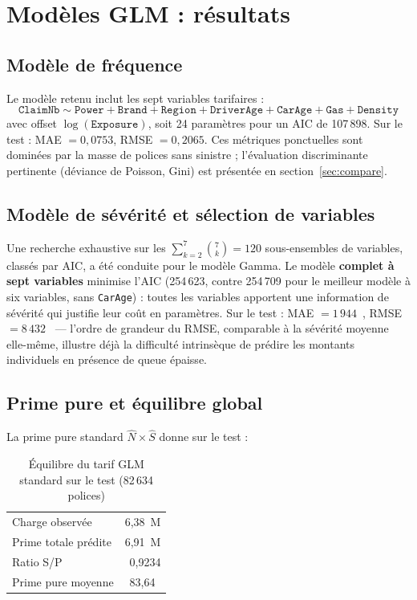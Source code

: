 \documentclass[11pt,a4paper]{article}
\newcommand{\eur}{\texteuro}
\begin{document}
\section{Modèles GLM : résultats}

\subsection{Modèle de fréquence}

Le modèle retenu inclut les sept variables tarifaires :
\[
\texttt{ClaimNb} \sim \texttt{Power} + \texttt{Brand} + \texttt{Region} + \texttt{DriverAge} + \texttt{CarAge} + \texttt{Gas} + \texttt{Density}
\]
avec offset $\log(\texttt{Exposure})$, soit 24 paramètres pour un AIC de 107\,898. Sur le test : MAE $= 0{,}0753$, RMSE $= 0{,}2065$. Ces métriques ponctuelles sont dominées par la masse de polices sans sinistre ; l'évaluation discriminante pertinente (déviance de Poisson, Gini) est présentée en section~\ref{sec:compare}.

\subsection{Modèle de sévérité et sélection de variables}

Une recherche exhaustive sur les $\sum_{k=2}^{7}\binom{7}{k} = 120$ sous-ensembles de variables, classés par AIC, a été conduite pour le modèle Gamma. Le modèle \textbf{complet à sept variables} minimise l'AIC (254\,623, contre 254\,709 pour le meilleur modèle à six variables, sans \texttt{CarAge}) : toutes les variables apportent une information de sévérité qui justifie leur coût en paramètres. Sur le test : MAE $= 1\,944$~\eur, RMSE $= 8\,432$~\eur{} --- l'ordre de grandeur du RMSE, comparable à la sévérité moyenne elle-même, illustre déjà la difficulté intrinsèque de prédire les montants individuels en présence de queue épaisse.

\subsection{Prime pure et équilibre global}

La prime pure standard $\widehat{N} \times \widehat{S}$ donne sur le test :
\begin{table}[H]
\centering
\caption{Équilibre du tarif GLM standard sur le test (82\,634 polices)}
\begin{tabular}{lr}
\toprule
Charge observée & 6{,}38~M\eur \\
Prime totale prédite & 6{,}91~M\eur \\
Ratio S/P & 0{,}9234 \\
Prime pure moyenne & 83{,}64~\eur \\
\bottomrule
\end{tabular}
\end{table}
\end{document}
